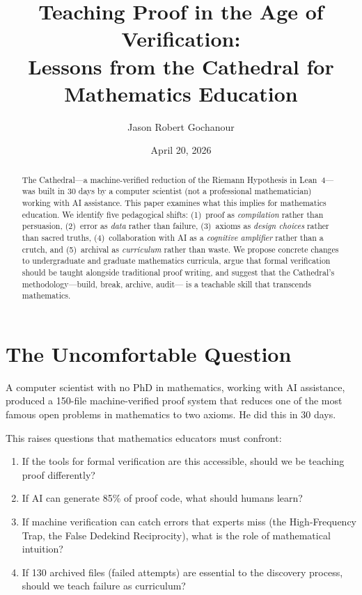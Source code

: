 \documentclass[11pt,a4paper]{article}
\title{%
  Teaching Proof in the Age of Verification:\\
  Lessons from the Cathedral for Mathematics Education%
}
\author{
  Jason Robert Gochanour
}
\date{April 20, 2026}
\begin{document}
\maketitle

\begin{abstract}
The Cathedral---a machine-verified reduction of the Riemann Hypothesis
in Lean~4---was built in 30 days by a computer scientist (not a
professional mathematician) working with AI assistance. This paper
examines what this implies for mathematics education. We identify
five pedagogical shifts: (1)~proof as \emph{compilation} rather than
persuasion, (2)~error as \emph{data} rather than failure,
(3)~axioms as \emph{design choices} rather than sacred truths,
(4)~collaboration with AI as a \emph{cognitive amplifier} rather
than a crutch, and (5)~archival as \emph{curriculum} rather
than waste. We propose concrete changes to undergraduate and
graduate mathematics curricula, argue that formal verification
should be taught alongside traditional proof writing, and suggest
that the Cathedral's methodology---build, break, archive, audit---
is a teachable skill that transcends mathematics.
\end{abstract}

\tableofcontents

\section{The Uncomfortable Question}

A computer scientist with no PhD in mathematics, working with AI
assistance, produced a 150-file machine-verified proof system that
reduces one of the most famous open problems in mathematics to two
axioms. He did this in 30 days.

This raises questions that mathematics educators must confront:

\begin{enumerate}
  \item If the tools for formal verification are this accessible,
    should we be teaching proof differently?
  \item If AI can generate 85\% of proof code, what should humans
    learn?
  \item If machine verification can catch errors that experts miss
    (the High-Frequency Trap, the False Dedekind Reciprocity), what
    is the role of mathematical intuition?
  \item If 130 archived files (failed attempts) are essential to the
    discovery process, should we teach failure as curriculum?
\end{enumerate}
\end{document}
